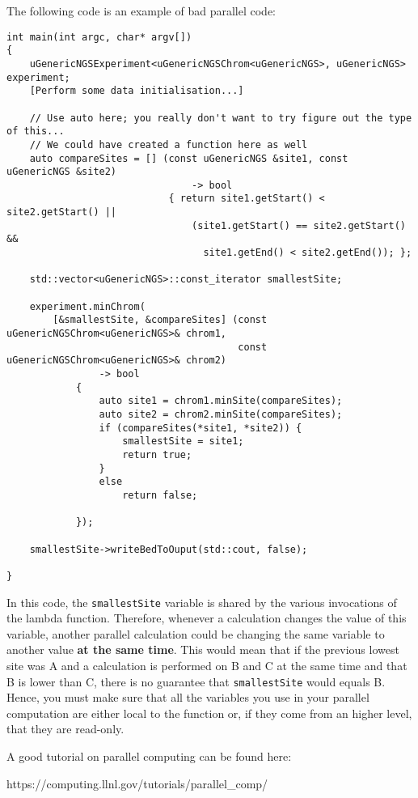 \documentclass[letterpaper,10pt]{article}
\begin{document}
The following code is an example of bad parallel code:
\begin{verbatim}
int main(int argc, char* argv[])
{
    uGenericNGSExperiment<uGenericNGSChrom<uGenericNGS>, uGenericNGS> experiment;
    [Perform some data initialisation...]

    // Use auto here; you really don't want to try figure out the type of this...
    // We could have created a function here as well
    auto compareSites = [] (const uGenericNGS &site1, const uGenericNGS &site2) 
                                -> bool
                            { return site1.getStart() < site2.getStart() ||
                                (site1.getStart() == site2.getStart() &&
                                  site1.getEnd() < site2.getEnd()); };

    std::vector<uGenericNGS>::const_iterator smallestSite;

    experiment.minChrom(
        [&smallestSite, &compareSites] (const uGenericNGSChrom<uGenericNGS>& chrom1,
                                        const uGenericNGSChrom<uGenericNGS>& chrom2) 
                -> bool
            {
                auto site1 = chrom1.minSite(compareSites);
                auto site2 = chrom2.minSite(compareSites);
                if (compareSites(*site1, *site2)) {
                    smallestSite = site1;
                    return true;
                }
                else
                    return false;

            });

    smallestSite->writeBedToOuput(std::cout, false);

} 
\end{verbatim}

In this code, the \verb+smallestSite+ variable is shared by the various invocations of the lambda function. Therefore, whenever a calculation changes the value of this variable, another parallel calculation could be changing the same variable to another value \textbf{at the same time}. This would mean that if the previous lowest site was A and a calculation is performed on B and C at the same time and that B is lower than C, there is no guarantee that \verb+smallestSite+ would equals B. Hence, you must make sure that all the variables you use in your parallel computation are either local to the function or, if they come from an higher level, that they are read-only.
\bigskip

{\noindent}A good tutorial on parallel computing can be found here: 

https://computing.llnl.gov/tutorials/parallel\_comp/
\end{document}
